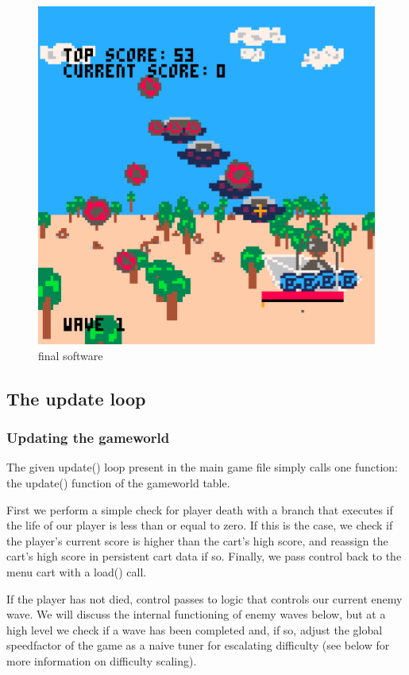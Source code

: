 \documentclass[11pt]{article}
\begin{document}
\begin{figure}[h]
    \centering
    \includegraphics[width=.8\textwidth]{final3d}
    \caption{final software}
    \label{fig:3dfinal}
\end{figure}

\subsection{The update loop}\label{update}

\subsubsection*{Updating the gameworld}
The given \textunderscore update() loop present in the main game file simply calls one
function: the update() function of the game\textunderscore world table.

First we perform a simple check for player death with a branch that executes if the
life of our player is less than or equal to zero. If this is the case, we check if
the player's current score is higher than the cart's high score, and reassign the
cart's high score in persistent cart data if so. Finally, we pass control back to
the menu cart with a load() call.

If the player has not died, control passes to logic that controls our current enemy
wave. We will discuss the internal functioning of enemy waves below, but at a high level
we check if a wave has been completed and, if so, adjust the global
speed\textunderscore factor of the game as a naive tuner for escalating difficulty
(see below for more information on difficulty scaling).
\end{document}
